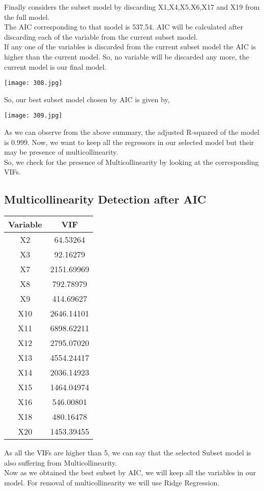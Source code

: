 \documentclass[a4paper,12pt,twoside]{book}
\begin{document}
Finally considers the subset model by discarding X1,X4,X5,X6,X17 and X19 from the full model.\\
The AIC corresponding to that model is 537.54. AIC will be calculated after discarding each of the variable from the current subset model.\\
If any one of the variables is discarded from the current subset model the AIC is higher than the current model. So, no variable will be discarded any more, the current model is our final model.\\
\begin{center}
\texttt{[image: 308.jpg]}\\
\end{center}
So, our best subset model chosen by AIC is given by,\\
\begin{center}
\texttt{[image: 309.jpg]}\\
\end{center}
As we can observe from the above summary, the adjusted R-squared of the model is 0.999. Now, we want to keep all the regressors in our selected model but their may be presence of multicollinearity.\\
So, we check for the presence of Multicollinearity by looking at the corresponding VIFs.
\subsection*{Multicollinearity Detection after AIC}
\begin{center}
\begin{tabular}{||c c||} 
 \hline
 Variable & VIF\\ [0.5ex] 
 \hline\hline
 X2 & 64.53264\\ 
 \hline
 X3 & 92.16279\\
 \hline
 X7 & 2151.69969\\
 \hline
 X8 & 792.78979\\
 \hline
 X9 & 414.69627\\ 
 \hline
 X10 & 2646.14101\\ 
 \hline
 X11 & 6898.62211\\
 \hline
 X12 & 2795.07020\\
 \hline
 X13 & 4554.24417\\
 \hline
 X14 & 2036.14923\\
 \hline
 X15 & 1464.04974\\
 \hline
 X16 & 546.00801\\
 \hline
 X18 & 480.16478\\
 \hline
 X20 & 1453.39455\\[1ex] 
 \hline
\end{tabular}
\end{center}
As all the VIFs are higher than 5, we can say that the selected Subset model is also suffering from Multicollinearity.\\
Now as we obtained the best subset by AIC, we will keep all the variables in our model. For removal of multicollinearity we will use Ridge Regression.
\newpage
\end{document}
